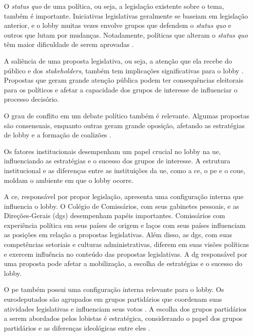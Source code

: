     O \textit{status quo }de uma política, ou seja, a legislação existente sobre o tema, também é importante. Iniciativas legislativas geralmente se baseiam em legislação anterior, e o lobby muitas vezes envolve grupos que defendem o \textit{status quo} e outros que lutam por mudanças. Notadamente, políticas que alteram o \textit{status quo} têm maior dificuldade de serem aprovadas \cite{baumgartner2009lobbying}.

    A saliência de uma proposta legislativa, ou seja, a atenção que ela recebe do público e dos \textit{stakeholders}, também tem implicações significativas para o lobby \cite{mahoney_lobbying_2007, mahoney2008brussels}. Propostas que geram grande atenção pública podem ter consequências eleitorais para os políticos e afetar a capacidade dos grupos de interesse de influenciar o processo decisório. 

    O grau de conflito em um debate político também é relevante. Algumas propostas são consensuais, enquanto outras geram grande oposição, afetando as estratégias de lobby e a formação de coalizões \cite{kluver_informational_2012, mahoney_lobbying_2007, mahoney2008brussels}.

Os fatores institucionais desempenham um papel crucial no lobby na \acrshort{ue}, influenciando as estratégias e o sucesso dos grupos de interesse. A estrutura institucional e as diferenças entre as instituições da \acrshort{ue}, como a \acrshort{ce}, o \acrshort{pe} e o \acrshort{coue}, moldam o ambiente em que o lobby ocorre.

    A \acrshort{ce}, responsável por propor legislação, apresenta uma configuração interna que influencia o lobby. O Colégio de Comissários, com seus gabinetes pessoais, e as Direções-Gerais (\acrshort{dg}s) desempenham papéis importantes. Comissários com experiência política em seus países de origem e laços com seus países influenciam as posições em relação a propostas legislativas. Além disso, as \acrshort{dg}s, com suas competências setoriais e culturas administrativas, diferem em suas visões políticas e exercem influência no conteúdo das propostas legislativas. A \acrshort{dg} responsável por uma proposta pode afetar a mobilização, a escolha de estratégias e o sucesso do lobby.

    O \acrshort{pe} também possui uma configuração interna relevante para o lobby. Os eurodeputados são agrupados em grupos partidários que coordenam suas atividades legislativas e influenciam seus votos \cite{Hix2002}. A escolha dos grupos partidários a serem abordados pelos lobistas é estratégica, considerando o papel dos grupos partidários e as diferenças ideológicas entre eles \cite{marshall2015explaining}.

